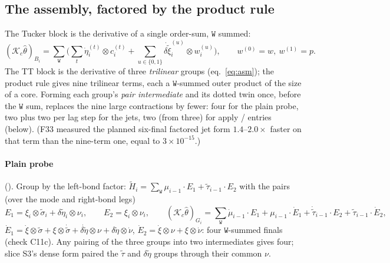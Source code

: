 \documentclass[11pt]{article}
\newcommand{\K}{\mathcal{K}}
\newcommand{\thh}{\hat\theta}
\newcommand{\ddet}{\delta\tilde\eta}
\newcommand{\dxt}{\delta\tilde\xi}
\theoremstyle{definition}
\theoremstyle{plain}
\begin{document}
\subsection{The assembly, factored by the product rule}
\label{sec:assembly}

The Tucker block is the derivative of a single order-sum, $\mathtt W$ summed:
\begin{equation}
  \label{eq:tuckerdot}
  (\K_c\thh)_{B_i}=\sum_{\mathtt W}\Big(\sum_t\dot\eta_i^{(t)}\otimes c_i^{(t)}+\sum_{u\in\{0,1\}}\dot{\dxt}_i^{(u)}\otimes w_i^{(u)}\Big),
  \qquad w^{(0)}=w,\ w^{(1)}=p .
\end{equation}
The TT block is the derivative of three \emph{trilinear} groups (eq.~\eqref{eq:asm}); the product rule gives nine
trilinear terms, each a $\mathtt W$-summed outer product of the size of a core. Forming each group's
\emph{pair intermediate} and its dotted twin once, before the $\mathtt W$ sum, replaces the nine large
contractions by fewer: four for the plain probe, two plus two per lag step for the jets, two (from three) for
apply / entries (below). (F33 measured the planned six-final factored jet form $1.4$--$2.0\times$ faster on that
term than the nine-term one, equal to $3\times10^{-15}$.)

\paragraph{Plain probe} (). Group by the left-bond factor:
$\tilde H_i=\sum_{\mathtt W}\mu_{i-1}\cdot E_1+\tilde\tau_{i-1}\cdot E_2$ with the pairs (over the mode and
right-bond legs)
\begin{equation}
  \label{eq:pairs}
  E_1=\xi_i\otimes\tilde\sigma_i+\ddet_i\otimes\nu_i,\qquad E_2=\xi_i\otimes\nu_i,\qquad
  (\K_c\thh)_{G_i}=\sum_{\mathtt W}\dot\mu_{i-1}\cdot E_1+\mu_{i-1}\cdot\dot E_1+\dot{\tilde\tau}_{i-1}\cdot E_2+\tilde\tau_{i-1}\cdot\dot E_2,
\end{equation}
$\dot E_1=\dot\xi\otimes\tilde\sigma+\xi\otimes\dot{\tilde\sigma}+\dot{\ddet}\otimes\nu+\ddet\otimes\dot\nu$,
$\dot E_2=\dot\xi\otimes\nu+\xi\otimes\dot\nu$: four $\mathtt W$-summed finals (check C11c). Any pairing of the three
groups into two intermediates gives four; slice S3's dense form paired the $\tilde\tau$ and $\ddet$ groups through
their common $\nu$.
\end{document}
